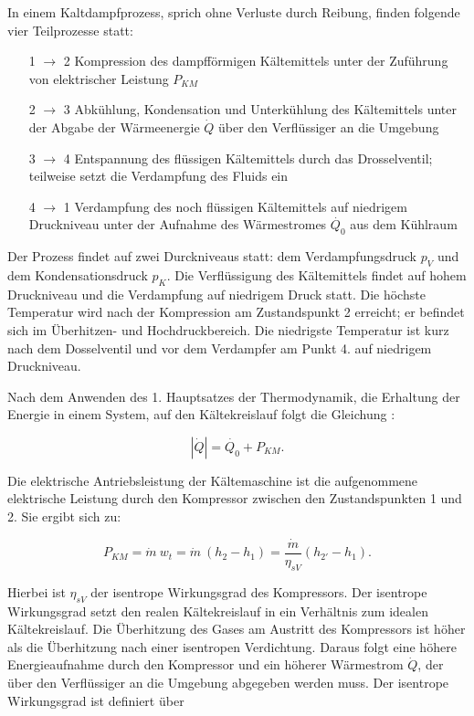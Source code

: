 In einem  Kaltdampfprozess, sprich ohne Verluste durch Reibung, finden folgende vier Teilprozesse statt:

\begin{itemize}
\item[1 $\longrightarrow$ 2] Kompression des dampfförmigen Kältemittels unter der Zuführung von elektrischer Leistung $P_{KM}$
\item[2 $\longrightarrow$ 3] Abkühlung, Kondensation und Unterkühlung des Kältemittels unter der Abgabe der Wärmeenergie $\dot{Q}$ über den Verflüssiger an die Umgebung
\item[3 $\longrightarrow$ 4] Entspannung des flüssigen Kältemittels durch das Drosselventil; teilweise setzt die Verdampfung des Fluids ein 
\item[4 $\longrightarrow$ 1] Verdampfung des noch flüssigen Kältemittels auf niedrigem Druckniveau unter der Aufnahme des Wärmestromes $\dot{Q_0}$ aus dem Kühlraum
\end{itemize}

Der Prozess findet auf zwei Durckniveaus statt: dem Verdampfungsdruck $p_V$ und dem Kondensationsdruck $p_K$. Die Verflüssigung des Kältemittels findet auf hohem Druckniveau und die Verdampfung auf niedrigem Druck statt. Die höchste Temperatur wird nach der Kompression am Zustandspunkt 2 erreicht; er befindet sich im Überhitzen- und Hochdruckbereich. Die niedrigste Temperatur ist kurz nach dem Dosselventil und vor dem Verdampfer am Punkt 4. auf niedrigem Druckniveau. 

Nach dem Anwenden des 1. Hauptsatzes der Thermodynamik, die Erhaltung der Energie in einem System, auf den Kältekreislauf folgt die Gleichung :

 \begin{equation}
 	|\dot{Q}|  = \dot{Q_0} +  P_{KM}.
 	\label{eq:Energiebilanz}
 \end{equation}
 
Die elektrische Antriebsleistung der Kältemaschine ist die aufgenommene elektrische Leistung durch den Kompressor zwischen den Zustandspunkten 1  und 2. Sie ergibt sich zu:

\begin{equation}
P_{KM} = \dot{m}~ w_t= \dot{m}~ (h_2 - h_1) = \frac{\dot{m} }{\eta_{sV}} (h_{2'}- h_1).
\label{eq:Antriebsleistung}
\end{equation}

Hierbei ist $\eta_{sV}$ der isentrope Wirkungsgrad des Kompressors. Der isentrope Wirkungsgrad setzt den realen Kältekreislauf in ein Verhältnis zum idealen Kältekreislauf. Die Überhitzung des Gases am Austritt des Kompressors ist höher als die Überhitzung nach einer isentropen Verdichtung. Daraus folgt eine höhere Energieaufnahme durch den Kompressor und ein höherer Wärmestrom $\dot{Q}$, der über den Verflüssiger an die Umgebung abgegeben werden muss. Der isentrope Wirkungsgrad ist definiert über 

